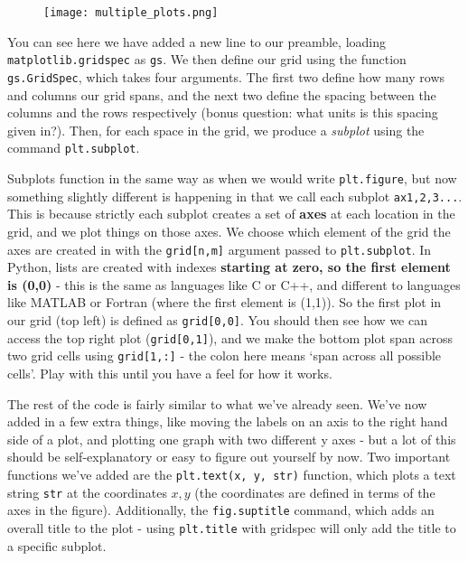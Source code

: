 \documentclass[10pt,a4paper]{memoir}
\begin{document}
\begin{figure}
	\centering
	\texttt{[image: multiple\_plots.png]}
\end{figure}

You can see here we have added a new line to our preamble, loading \texttt{matplotlib.gridspec} as \texttt{gs}. We then define our grid using the function \texttt{gs.GridSpec}, which takes four arguments. The first two define how many rows and columns our grid spans, and the next two define the spacing between the columns and the rows respectively (bonus question: what units is this spacing given in?). Then, for each space in the grid, we produce a \emph{subplot} using the command \texttt{plt.subplot}.

Subplots function in the same way as when we would write \texttt{plt.figure}, but now something slightly different is happening in that we call each subplot \texttt{ax1,2,3...}. This is because strictly each subplot creates a set of \textbf{axes} at each location in the grid, and we plot things on those axes. We choose which element of the grid the axes are created in with the \texttt{grid[n,m]} argument passed to \texttt{plt.subplot}. In Python, lists are created with indexes \textbf{starting at zero, so the first element is (0,0)} - this is the same as languages like C or C++, and different to languages like MATLAB or Fortran (where the first element is (1,1)). So the first plot in our grid (top left) is defined as \texttt{grid[0,0]}. You should then see how we can access the top right plot (\texttt{grid[0,1]}), and we make the bottom plot span across two grid cells using \texttt{grid[1,:]} - the colon here means `span across all possible cells'. Play with this until you have a feel for how it works. 

The rest of the code is fairly similar to what we've already seen. We've now added in a few extra things, like moving the labels on an axis to the right hand side of a plot, and plotting one graph with two different y axes - but a lot of this should be self-explanatory or easy to figure out yourself by now. Two important functions we've added are the \texttt{plt.text(x, y, str)} function, which plots a text string \texttt{str} at the coordinates $x, y$ (the coordinates are defined in terms of the axes in the figure). Additionally, the \texttt{fig.suptitle} command, which adds an overall title to the plot - using \texttt{plt.title} with gridspec will only add the title to a specific subplot. 
\end{document}
